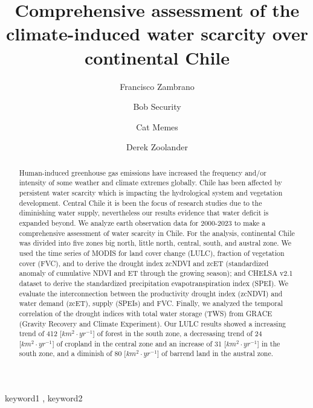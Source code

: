 \documentclass[preprint,
3p]{elsarticle} %
\begin{document}
\begin{frontmatter}

  \title{Comprehensive assessment of the climate-induced water scarcity
over continental Chile}
    \author[Hemera Centro de Observación de la Tierra,Universidad
Mayor]{Francisco Zambrano%
  }
    \author[Another University]{Bob Security%
  }
    \author[Another University]{Cat Memes%
  }
    \author[Some Institute of Technology]{Derek Zoolander%
  }
  
  \begin{abstract}
  Human-induced greenhouse gas emissions have increased the frequency
  and/or intensity of some weather and climate extremes globally. Chile
  has been affected by persistent water scarcity which is impacting the
  hydrological system and vegetation development. Central Chile it is
  been the focus of research studies due to the diminishing water
  supply, nevertheless our results evidence that water deficit is
  expanded beyond. We analyze earth observation data for 2000-2023 to
  make a comprehensive assessment of water scarcity in Chile. For the
  analysis, continental Chile was divided into five zones big north,
  little north, central, south, and austral zone. We used the time
  series of MODIS for land cover change (LULC), fraction of vegetation
  cover (FVC), and to derive the drought index zcNDVI and zcET
  (standardized anomaly of cumulative NDVI and ET through the growing
  season); and CHELSA v2.1 dataset to derive the standardized
  precipitation evapotranspiration index (SPEI). We evaluate the
  interconnection between the productivity drought index (zcNDVI) and
  water demand (zcET), supply (SPEIs) and FVC. Finally, we analyzed the
  temporal correlation of the drought indices with total water storage
  (TWS) from GRACE (Gravity Recovery and Climate Experiment). Our LULC
  results showed a increasing trend of 412 \([km^2\cdot yr^{-1}\){]} of
  forest in the south zone, a decresasing trend of 24
  \([km^2\cdot yr^{-1}\){]} of cropland in the central zone and an
  increase of 31 \([km^2\cdot yr^{-1}\){]} in the south zone, and a
  diminish of 80 \([km^2\cdot yr^{-1}\){]} of barrend land in the
  austral zone.
  \end{abstract}
    \begin{keyword}
    keyword1 \sep 
    keyword2
  \end{keyword}
  
 \end{frontmatter}
\end{document}
